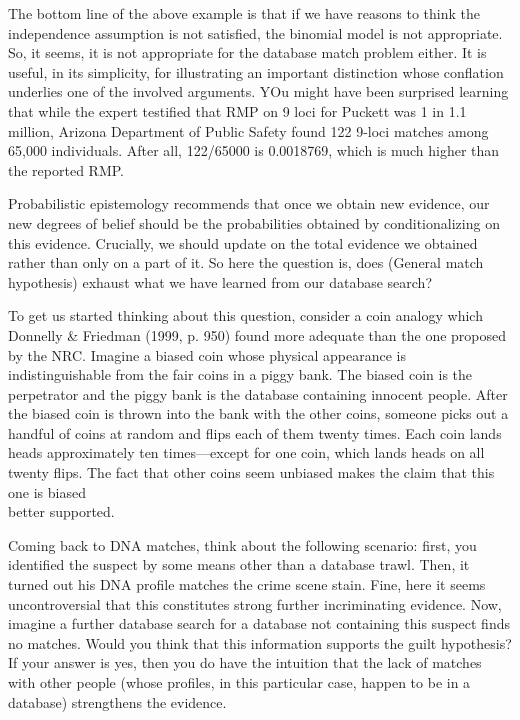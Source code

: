 \documentclass[10pt,dvipsnames,enabledeprecatedfontcommands]{scrartcl}
\begin{document}
The bottom line of the above example is that if we have reasons to think
the independence assumption is not satisfied, the binomial model is not
appropriate. So, it seems, it is not appropriate for the database match
problem either. It is useful, in its simplicity, for illustrating an
important distinction whose conflation underlies one of the involved
arguments. YOu might have been surprised learning that while the expert
testified that RMP on 9 loci for Puckett was 1 in 1.1 million, Arizona
Department of Public Safety found 122 9-loci matches among 65,000
individuals. After all, 122/65000 is 0.0018769, which is much higher
than the reported RMP.

Probabilistic epistemology recommends that once we obtain new evidence,
our new degrees of belief should be the probabilities obtained by
conditionalizing on this evidence. Crucially, we should update on the
total evidence we obtained rather than only on a part of it. So here the
question is, does (General match hypothesis) exhaust what we have
learned from our database search?

To get us started thinking about this question, consider a coin analogy
which Donnelly \& Friedman (1999, p. 950) found more adequate than the
one proposed by the NRC. Imagine a biased coin whose physical appearance
is indistinguishable from the fair coins in a piggy bank. The biased
coin is the perpetrator and the piggy bank is the database containing
innocent people. After the biased coin is thrown into the bank with the
other coins, someone picks out a handful of coins at random and flips
each of them twenty times. Each coin lands heads approximately ten
times---except for one coin, which lands heads on all twenty flips. The
fact that other coins seem unbiased makes the claim that this one is
biased\\
better supported.

Coming back to DNA matches, think about the following scenario: first,
you identified the suspect by some means other than a database trawl.
Then, it turned out his DNA profile matches the crime scene stain. Fine,
here it seems uncontroversial that this constitutes strong further
incriminating evidence. Now, imagine a further database search for a
database not containing this suspect finds no matches. Would you think
that this information supports the guilt hypothesis? If your answer is
yes, then you do have the intuition that the lack of matches with other
people (whose profiles, in this particular case, happen to be in a
database) strengthens the evidence.
\end{document}
